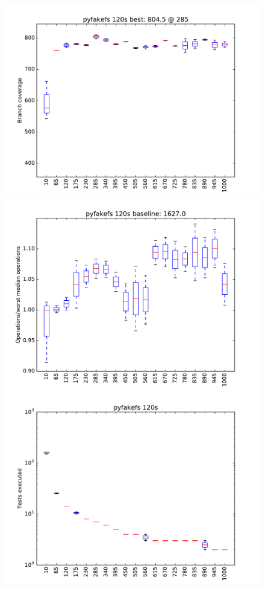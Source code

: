 \begin{figure}
\includegraphics[width=\columnwidth]{graphs/pyfakefsrand120}
\includegraphics[width=\columnwidth]{graphs/opspyfakefsrand120}
\includegraphics[width=\columnwidth]{graphs/execpyfakefsrand120}
\end{figure}


